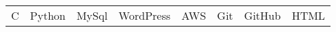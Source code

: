 

\begin{tabular}{l l l l l l l l}
\footnotesize C & \footnotesize Python & \footnotesize MySql  & \footnotesize WordPress & \footnotesize AWS & \footnotesize Git & \footnotesize GitHub & \footnotesize HTML \\
\end{tabular}

  

